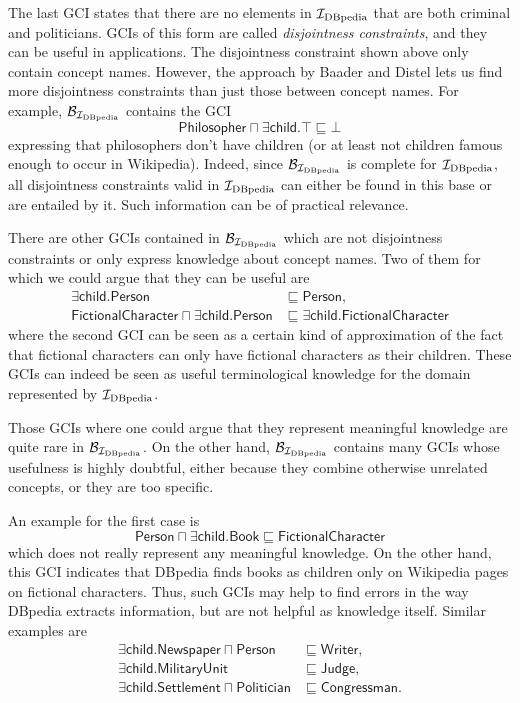 The last GCI states that there are no elements in ${\mathcal{I}_{\text{DBpedia}}}$ that are both criminal and
politicians.  GCIs of this form are called \emph{disjointness constraints}, and they can
be useful in applications.  The disjointness constraint shown above only contain concept
names.  However, the approach by Baader and Distel lets us find more disjointness
constraints than just those between concept names.  For example, $\mathcal{B}_{{\mathcal{I}_{\text{DBpedia}}}}$
contains the GCI
\begin{equation*}
   \mathsf{Philosopher} \sqcap \exists \mathsf{child}. \top \sqsubseteq \bot
\end{equation*}
expressing that philosophers don't have children (or at least not children famous enough
to occur in Wikipedia).  Indeed, since $\mathcal{B}_{{\mathcal{I}_{\text{DBpedia}}}}$ is complete for
${\mathcal{I}_{\text{DBpedia}}}$, all disjointness constraints valid in ${\mathcal{I}_{\text{DBpedia}}}$ can either be found in this
base or are entailed by it.  Such information can be of practical relevance.

There are other GCIs contained in $\mathcal{B}_{\mathcal{I}_{\text{DBpedia}}}$ which are not disjointness
constraints or only express knowledge about concept names.  Two of them for which we could
argue that they can be useful are
\begin{align*}
  \mathsf{\exists child. Person} &\sqsubseteq \mathsf{Person}, \\
  \mathsf{FictionalCharacter \sqcap \exists child. Person} &\sqsubseteq \mathsf{\exists
    child. FictionalCharacter}
\end{align*}
where the second GCI can be seen as a certain kind of \ELbot approximation of the fact
that fictional characters can only have fictional characters as their children.  These
GCIs can indeed be seen as useful terminological knowledge for the domain represented by
${\mathcal{I}_{\text{DBpedia}}}$.

Those GCIs where one could argue that they represent meaningful knowledge are quite rare
in $\mathcal{B}_{\mathcal{I}_{\text{DBpedia}}}$.  On the other hand, $\mathcal{B}_{\mathcal{I}_{\text{DBpedia}}}$ contains many GCIs
whose usefulness is highly doubtful, either because they combine otherwise unrelated
concepts, or they are too specific.

An example for the first case is
\begin{equation*}
  \mathsf{Person \sqcap \exists child. Book \sqsubseteq FictionalCharacter}
\end{equation*}
which does not really represent any meaningful knowledge.  On the other hand, this GCI
indicates that DBpedia finds books as children only on Wikipedia pages on fictional
characters.  Thus, such GCIs may help to find errors in the way DBpedia extracts
information, but are not helpful as knowledge itself.  Similar examples are
\begin{align*}
  \mathsf{\exists child. Newspaper \sqcap Person} &\sqsubseteq \mathsf{Writer}, \\
  \mathsf{\exists child. MilitaryUnit} &\sqsubseteq \mathsf{Judge}, \\
  \mathsf{\exists child. Settlement \sqcap Politician} &\sqsubseteq \mathsf{Congressman}.
\end{align*}

